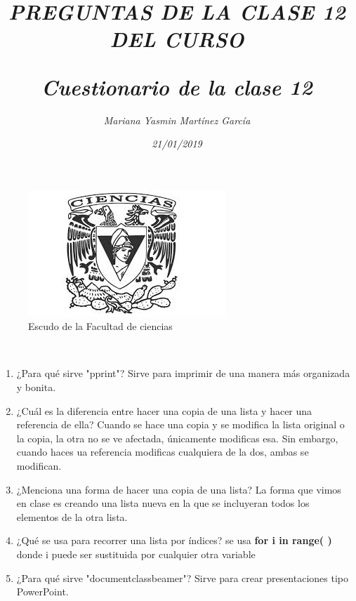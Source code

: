 \documentclass{article}
\title{\Huge\item\color{magenta}\textit{PREGUNTAS DE LA CLASE 12 DEL CURSO}}
\author{\Large\textit{Mariana Yasmin Martínez García}}
\date{\Large\textit{21/01/2019}}
\begin{document}
\begin{figure}[t]
	\centering
	\includegraphics[width=0.7\linewidth]{Imagenes/1}
	\caption{Escudo de la Facultad de ciencias}
	\label{figura:1}
\end{figure}

	\maketitle
		
	\newpage
	
	\title{\huge\color{magenta}\textbf{\textit{Cuestionario de la clase 12}}} \\
	\begin{enumerate}
		 \item{\Large\color{red} ¿Para qué sirve "pprint"?} Sirve para imprimir de una manera más organizada y bonita.
		 \item{\Large\color{red} ¿Cuál es la diferencia entre hacer una copia de una lista y hacer una referencia de ella?} Cuando se hace una copia y se modifica la lista original o la copia, la otra no se ve afectada, únicamente modificas esa. Sin embargo, cuando haces ua referencia  modificas cualquiera de la dos, ambas se modifican.
		 \item{\Large\color{red} ¿Menciona una forma de hacer una copia de una lista?} La forma que vimos en clase es creando una lista nueva en la que se incluyeran todos los elementos de la otra lista.
		 \item{\Large\color{red} ¿Qué se usa para recorrer una lista por índices?} se usa \textbf{for i in range( )} donde i puede ser sustituida por cualquier otra variable
		 \item{\Large\color{red} ¿Para qué sirve "documentclass{beamer}"?} Sirve para crear presentaciones tipo PowerPoint.
	\end{enumerate}
	
\end{document}
